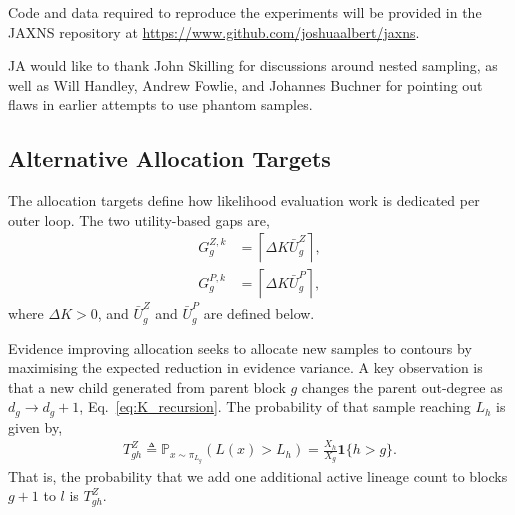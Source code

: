 \documentclass[pdflatex,sn-basic,icol]{sn-jnl}
\newcommand{\Prob}{\mathbb{P}}
\theoremstyle{plain}
\theoremstyle{definition}
\begin{document}
\backmatter


Code and data required to reproduce the experiments will be provided in the JAXNS repository at \url{https://www.github.com/joshuaalbert/jaxns}.


JA would like to thank John Skilling for discussions around nested sampling, as well as Will Handley, Andrew Fowlie, and Johannes Buchner for pointing out flaws in earlier attempts to use phantom samples.

\begin{appendices}

\section{Alternative Allocation Targets}\label{sec:allocation_targets}
The allocation targets define how likelihood evaluation work is dedicated per outer loop.
The two utility-based gaps are,
\begin{align}
    G_g^{Z,k} &= \left\lceil\Delta K \bar{U}^Z_g\right\rceil,\\
    G_g^{P,k} &= \left\lceil\Delta K \bar{U}^P_g\right\rceil,
\end{align}
where $\Delta K > 0$, and $\bar{U}^Z_g$ and $\bar{U}^P_g$ are defined below.

Evidence improving allocation seeks to allocate new samples to contours by maximising the expected reduction in evidence variance.
A key observation is that a new child generated from parent block $g$ changes the parent out-degree as $d_g\to d_g+1$, Eq.~\ref{eq:K_recursion}.
The probability of that sample reaching $L_h$ is given by,
\begin{align}
    T^Z_{g h}
    \triangleq
    \Prob_{x\sim\pi_{L_g}}(L(x)>L_h)
    = \frac{X_h}{X_g} \mathbf{1}\{h>g\}.
    \label{eq:evidence_reach_probability}
\end{align}
That is, the probability that we add one additional active lineage count to blocks $g+1$ to $l$ is $T^Z_{g h}$.


\end{appendices}
\end{document}
